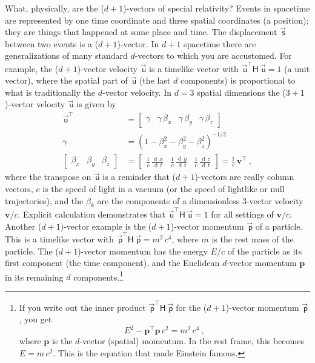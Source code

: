 \documentclass{article}
\newcommand{\metric}{\mathsf{H}}
\DeclareMathOperator{\dd}{d\!}
\newcommand\upvec[1]{\!\vec{\,\mathrm{#1}}}
\newcommand{\Evec}[1]{{\mathbf{#1}}} %
\newcommand{\Lvec}[1]{\upvec{\mathsf{#1}}} %
\newcommand{\plus}{\!+\!} %
\begin{document}
What, physically, are the ($d\plus1$)-vectors of special relativity?
Events in spacetime are represented by one time coordinate and three spatial coordinates (a position); they are things that happened at some place and time.
The displacement $\Lvec{s}$ between two events is a ($d\plus1$)-vector.
In $d\plus1$ spacetime there are generalizations of many standard $d$-vectors to which you are accustomed.
For example,
the ($d\plus1$)-vector velocity $\Lvec{u}$ is a timelike vector with $\Lvec{u}^\top\metric\,\Lvec{u}=1$ (a unit vector), where the spatial part of $\Lvec{u}$ (the last $d$ components) is proportional to what is traditionally the $d$-vector velocity.
In $d=3$ spatial dimensions the ($3\plus1$)-vector velocity $\Lvec{u}$ is given by
\begin{align}
    \Lvec{u}^\top &= \begin{bmatrix} \gamma & \gamma\,\beta_x & \gamma\,\beta_y & \gamma\,\beta_z \end{bmatrix} \\
    \gamma &= (1 - \beta_x^2 - \beta_y^2 - \beta_z^2)^{-1/2} \nonumber\\
    \begin{bmatrix} \beta_x & \beta_y & \beta_z\end{bmatrix} &= \begin{bmatrix}\displaystyle\frac{1}{c}\,\frac{\dd x}{\dd t} & \displaystyle\frac{1}{c}\,\frac{\dd y}{\dd t} & \displaystyle\frac{1}{c}\,\frac{\dd z}{\dd t} \end{bmatrix} = \frac{1}{c}\,\Evec{v}^\top ~,\nonumber
\end{align}
where the transpose on $\Lvec{u}$ is a reminder that ($d\plus1$)-vectors are really column vectors,
$c$ is the speed of light in a vacuum (or the speed of lightlike or null trajectories),
and the $\beta_k$ are the components of a dimensionless 3-vector velocity $\Evec{v}/c$.
Explicit calculation demonstrates that $\Lvec{u}^\top\metric\,\Lvec{u}=1$ for all settings of $\Evec{v}/c$.
Another ($d\plus1$)-vector example is the ($d\plus1$)-vector momentum $\Lvec{p}$ of a particle.
This is a timelike vector with $\Lvec{p}^\top\metric\,\Lvec{p}=m^2\,c^4$, where $m$ is the rest mass of the particle.
The ($d\plus1$)-vector momentum has the energy $E / c$ of the particle as its first component (the time component), and the Euclidean $d$-vector momentum $\Evec{p}$ in its remaining $d$ components.\footnote{%
If you write out the inner product $\Lvec{p}^\top\metric\,\Lvec{p}$ for the ($d\plus1$)-vector momentum $\Lvec{p}$, you get $$E^2 - \Evec{p}^\top\Evec{p}\,c^2 = m^2\,c^4~,$$ where $\Evec{p}$ is the $d$-vector (spatial) momentum. In the rest frame, this becomes $E=m\,c^2$. This is the equation that made Einstein famous.}
\end{document}
